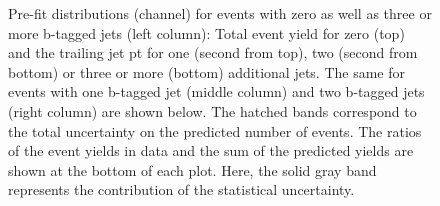 \begin{figure}[htbp!]
\begin{center}
\caption{Pre-fit distributions (\emu channel) for events with zero as well as three or
  more b-tagged jets (left column): Total event yield for zero (top) and the trailing jet pt for one (second from top),
  two (second from bottom) or three or more (bottom) additional jets. The same for events with one
  b-tagged jet (middle column) and two b-tagged jets (right column) are
  shown below.   
  The hatched bands correspond to the total uncertainty on the predicted number of events. The ratios of the event yields in data and the sum of the
  predicted yields are shown at the bottom of each plot. Here, the solid
  gray band represents the contribution of the statistical uncertainty.  
       \label{fig:xsec_emu_inputdistr}}
  \end{center}
\end{figure}

